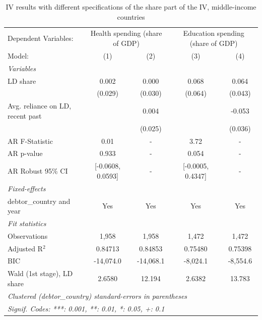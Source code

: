 
\begin{table}[htbp]
   \caption{\label{tab:results_iv_alt_share_other} IV results with different specifications of the share part of the IV, middle-income countries}
   \centering
   \begin{tabular}{lcccc}
      \tabularnewline \midrule \midrule
      Dependent Variables: & \multicolumn{2}{c}{Health spending (share of GDP)} & \multicolumn{2}{c}{Education spending (share of GDP)}\\
      Model:                           & (1)               & (2)       & (3)               & (4)\\  
      \midrule
      \emph{Variables}\\
      LD share                         & 0.002             & 0.000     & 0.068             & 0.064\\   
                                       & (0.029)           & (0.030)   & (0.064)           & (0.043)\\   
      Avg. reliance on LD, recent past &                   & 0.004     &                   & -0.053\\   
                                       &                   & (0.025)   &                   & (0.036)\\   
      AR F-Statistic                   & 0.01              & -         & 3.72              & -\\  
      AR p-value                       & 0.933             & -         & 0.054             & -\\  
      AR Robust 95\% CI                & [-0.0608, 0.0593] & -         & [-0.0005, 0.4347] & -\\  
      \midrule
      \emph{Fixed-effects}\\
      debtor\_country and year         & Yes               & Yes       & Yes               & Yes\\  
      \midrule
      \emph{Fit statistics}\\
      Observations                     & 1,958             & 1,958     & 1,472             & 1,472\\  
      Adjusted R$^2$                   & 0.84713           & 0.84853   & 0.75480           & 0.75398\\  
      BIC                              & -14,074.0         & -14,068.1 & -8,024.1          & -8,554.6\\  
      Wald (1st stage), LD share       & 2.6580            & 12.194    & 2.6382            & 13.783\\  
      \midrule \midrule
      \multicolumn{5}{l}{\emph{Clustered (debtor\_country) standard-errors in parentheses}}\\
      \multicolumn{5}{l}{\emph{Signif. Codes: ***: 0.001, **: 0.01, *: 0.05, +: 0.1}}\\
   \end{tabular}
\end{table}


